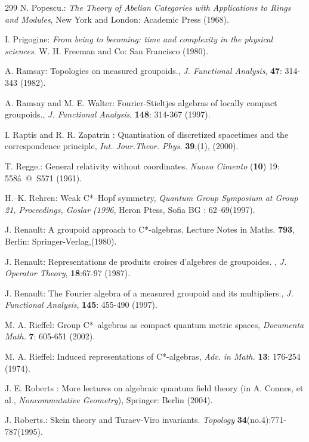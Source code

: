 \documentclass[12pt]{article}
\theoremstyle{plain}
\theoremstyle{definition}
\numberwithin{equation}{section}
\begin{document}
\begin{thebibliography} {299}
N. Popescu.: \emph{The Theory of Abelian Categories with Applications to Rings and
Modules}, New York and London: Academic Press (1968).

I. Prigogine: \textit{From being to becoming: time and complexity in the physical sciences}. W. H. Freeman and Co: San Francisco (1980).

A. Ramsay: Topologies on measured groupoids., \textit{J. Functional Analysis}, \textbf{47}: 314-343 (1982).

A. Ramsay and M. E. Walter: Fourier-Stieltjes algebras of locally compact groupoids.,
\textit{J. Functional Analysis}, \textbf{148}: 314-367 (1997).

I. Raptis and R. R. Zapatrin : Quantisation of discretized
spacetimes and the correspondence principle, \emph{Int. Jour.Theor. Phys.} \textbf{39},(1), (2000).

T. Regge.: General relativity without coordinates. \textit{Nuovo Cimento} (\textbf{10}) 19: 558\^a~@~S571 (1961).

H.--K. Rehren: Weak C*--Hopf symmetry, \emph{Quantum Group
Symposium at Group 21, Proceedings, Goslar (1996}, Heron Ptess, Sofia BG : 62--69(1997).

J. Renault: A groupoid approach to C*-algebras. Lecture Notes in Maths. \textbf{793}, Berlin: Springer-Verlag,(1980).

J. Renault: Representations de produits croises d'algebres de groupoides. ,
\textit{J. Operator Theory}, \textbf{18}:67-97 (1987).

J. Renault: The Fourier algebra of a measured groupoid and its multipliers.,
\textit{J. Functional Analysis}, \textbf{145}: 455-490 (1997).

M. A. Rieffel: Group C*--algebras as compact quantum metric spaces, \emph{Documenta Math.} \textbf{7}: 605-651 (2002).

M. A. Rieffel: Induced representations of C*-algebras, \emph{Adv. in Math.} \textbf{13}: 176-254 (1974).

J. E. Roberts : More lectures on algebraic quantum field theory (in A. Connes, et al., {\em Noncommutative Geometry}), Springer: Berlin (2004).

J. Roberts.: Skein theory and Turaev-Viro invariants. \textit{Topology} \textbf{34}(no.4):771-787(1995).


\end{thebibliography}
\end{document}
